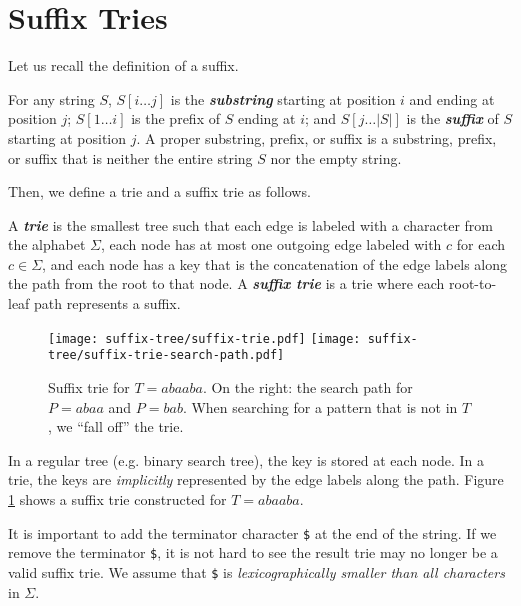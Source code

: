 \section{Suffix Tries}

Let us recall the definition of a suffix.

\begin{definition}[Suffix] 
    For any string $S$, $S[i\ldots j]$ is the \textit{\textbf{substring}} starting at position $i$ and ending at position $j$; $S[1\ldots i]$ is the prefix of $S$ ending at $i$; and $S[j\ldots |S|]$ is the \textit{\textbf{suffix}} of $S$ starting at position $j$. A proper substring, prefix, or suffix is a substring, prefix, or suffix that is neither the entire string $S$ nor the empty string.
\end{definition}

Then, we define a trie and a suffix trie as follows.

\begin{definition}  
    A \textit{\textbf{trie}} is the smallest tree such that each edge is labeled with a character from the alphabet $\Sigma$, each node has at most one outgoing edge labeled with $c$ for each $c \in \Sigma$, and each node has a key that is the concatenation of the edge labels along the path from the root to that node. A \textit{\textbf{suffix trie}} is a trie where each root-to-leaf path represents a suffix.
\end{definition}

\begin{figure}[htbp]
    \centering
    \texttt{[image: suffix-tree/suffix-trie.pdf]}
    \qquad
    \texttt{[image: suffix-tree/suffix-trie-search-path.pdf]}
    \caption{Suffix trie for $T = abaaba$. On the right: the search path for $P=abaa$ and $P=bab$. When searching for a pattern that is not in $T$, we ``fall off'' the trie.}
    \label{fig:suffix-trie}
\end{figure}

In a regular tree (e.g. binary search tree), the key is stored at each node. In a trie, the keys are \textit{implicitly} represented by the edge labels along the path. Figure \ref{fig:suffix-trie} shows a suffix trie constructed for $T = abaaba$.

It is important to add the terminator character \texttt{\$} at the end of the string. If we remove the terminator \texttt{\$}, it is not hard to see the result trie may no longer be a valid suffix trie. We assume that \texttt{\$} is \textit{lexicographically smaller than all characters} in $\Sigma$.

